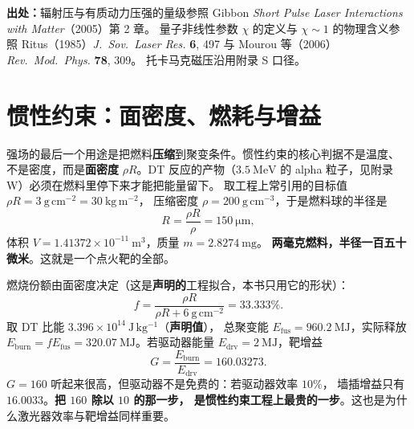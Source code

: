 {\footnotesize
\textbf{出处：}辐射压与有质动力压强的量级参照 Gibbon \emph{Short Pulse Laser
Interactions with Matter}（2005）第 2 章。
量子非线性参数 $\chi$ 的定义与
$\chi\sim1$ 的物理含义参照 Ritus（1985）\emph{J.\ Sov.\ Laser Res.} \textbf{6}, 497
与 Mourou 等（2006）\emph{Rev.\ Mod.\ Phys.} \textbf{78}, 309。
托卡马克磁压沿用附录 S 口径。
}

\section{惯性约束：面密度、燃耗与增益}
\label{sec:app-y-icf}

强场的最后一个用途是把燃料\textbf{压缩}到聚变条件。惯性约束的核心判据不是温度、
不是密度，而是\textbf{面密度} $\rho R$。DT 反应的产物（$3.5\ \mathrm{MeV}$
的 alpha 粒子，见附录 W）必须在燃料里停下来才能把能量留下。
取工程上常引用的目标值 $\rho R = 3\ \mathrm{g\,cm^{-2}} = 30\ \mathrm{kg\,m^{-2}}$，
压缩密度 $\rho = 200\ \mathrm{g\,cm^{-3}}$，于是燃料球的半径是
\begin{equation}
R = \frac{\rho R}{\rho} = 150\ \mathrm{\mu m},
\label{eq:app-y-rhor}
\end{equation}
体积 $V = 1.41372\times10^{-11}\ \mathrm{m^3}$，质量 $m = 2.8274\ \mathrm{mg}$。
\textbf{两毫克燃料，半径一百五十微米}。这就是一个点火靶的全部。

燃烧份额由面密度决定（这是\textbf{声明的}工程拟合，本书只用它的形状）：
\begin{equation}
f = \frac{\rho R}{\rho R + 6\ \mathrm{g\,cm^{-2}}} = 33.333\%.
\label{eq:app-y-burn}
\end{equation}
取 DT 比能 $3.396\times10^{14}\ \mathrm{J\,kg^{-1}}$（\textbf{声明值}），
总聚变能 $E_{\mathrm{fus}} = 960.2\ \mathrm{MJ}$，实际释放
$E_{\mathrm{burn}} = f E_{\mathrm{fus}} = 320.07\ \mathrm{MJ}$。若驱动器能量
$E_{\mathrm{drv}} = 2\ \mathrm{MJ}$，靶增益
\begin{equation}
G = \frac{E_{\mathrm{burn}}}{E_{\mathrm{drv}}} = 160.03273.
\label{eq:app-y-gainicf}
\end{equation}
$G = 160$ 听起来很高，但驱动器不是免费的：若驱动器效率 $10\%$，
墙插增益只有 $16.0033$。\textbf{把 $160$ 除以 $10$ 的那一步，
是惯性约束工程上最贵的一步}。这也是为什么激光器效率与靶增益同样重要。

